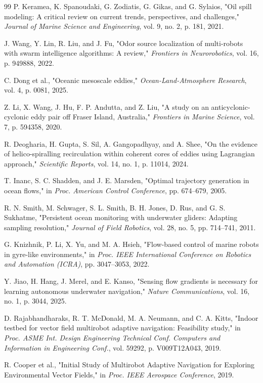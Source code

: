 \documentclass[lettersize,journal]{IEEEtran}
\begin{document}
\begin{thebibliography}{99}
 P. Keramea, K. Spanoudaki, G. Zodiatis, G. Gikas, and G. Sylaios, "Oil spill modeling: A critical review on current trends, perspectives, and challenges," \textit{Journal of Marine Science and Engineering}, vol. 9, no. 2, p. 181, 2021.

 J. Wang, Y. Lin, R. Liu, and J. Fu, "Odor source localization of multi-robots with swarm intelligence algorithms: A review," \textit{Frontiers in Neurorobotics}, vol. 16, p. 949888, 2022.

 C. Dong et al., "Oceanic mesoscale eddies," \textit{Ocean-Land-Atmosphere Research}, vol. 4, p. 0081, 2025.

 Z. Li, X. Wang, J. Hu, F. P. Andutta, and Z. Liu, "A study on an anticyclonic-cyclonic eddy pair off Fraser Island, Australia," \textit{Frontiers in Marine Science}, vol. 7, p. 594358, 2020.

 R. Deogharia, H. Gupta, S. Sil, A. Gangopadhyay, and A. Shee, "On the evidence of helico-spiralling recirculation within coherent cores of eddies using Lagrangian approach," \textit{Scientific Reports}, vol. 14, no. 1, p. 11014, 2024.

 T. Inanc, S. C. Shadden, and J. E. Marsden, "Optimal trajectory generation in ocean flows," in \textit{Proc. American Control Conference}, pp. 674--679, 2005.

 R. N. Smith, M. Schwager, S. L. Smith, B. H. Jones, D. Rus, and G. S. Sukhatme, "Persistent ocean monitoring with underwater gliders: Adapting sampling resolution," \textit{Journal of Field Robotics}, vol. 28, no. 5, pp. 714--741, 2011.

 G. Knizhnik, P. Li, X. Yu, and M. A. Hsieh, "Flow-based control of marine robots in gyre-like environments," in \textit{Proc. IEEE International Conference on Robotics and Automation (ICRA)}, pp. 3047--3053, 2022.

 Y. Jiao, H. Hang, J. Merel, and E. Kanso, "Sensing flow gradients is necessary for learning autonomous underwater navigation," \textit{Nature Communications}, vol. 16, no. 1, p. 3044, 2025.

 D. Rajabhandharaks, R. T. McDonald, M. A. Neumann, and C. A. Kitts, "Indoor testbed for vector field multirobot adaptive navigation: Feasibility study," in \textit{Proc. ASME Int. Design Engineering Technical Conf. Computers and Information in Engineering Conf.}, vol. 59292, p. V009T12A043, 2019.

 R. Cooper et al., "Initial Study of Multirobot Adaptive Navigation for Exploring Environmental Vector Fields," in \textit{Proc. IEEE Aerospace Conference}, 2019.


\end{thebibliography}
\end{document}
